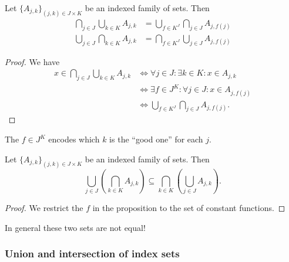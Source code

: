 \begin{proposition}
Let $\{A_{j,k}\}_{(j,k) \in J\times K}$ be an indexed family of sets. Then
\begin{align*}
\bigcap_{j\in J}\bigcup_{k\in K}A_{j,k} &= \bigcup_{f \in K^J}\bigcap_{j\in J}A_{j,f(j)} \\
\bigcup_{j\in J}\bigcap_{k\in K}A_{j,k} &= \bigcap_{f \in K^J}\bigcup_{j\in J}A_{j,f(j)}
\end{align*}
\end{proposition}
\begin{proof}
We have
\begin{align*}
x\in \bigcap_{j\in J}\bigcup_{k\in K}A_{j,k} &\iff \forall j\in J:\exists k\in K: x\in A_{j,k} \\
&\iff \exists f\in J^K: \forall j\in J: x\in A_{j, f(j)} \\
&\iff \bigcup_{f \in K^J}\bigcap_{j\in J}A_{j,f(j)}.
\end{align*}
\end{proof}
The $f\in J^K$ encodes which $k$ is the ``good one'' for each $j$.
\begin{corollary}
Let $\{A_{j,k}\}_{(j,k) \in J\times K}$ be an indexed family of sets. Then
\[ \bigcup_{j\in J}\left(\bigcap_{k\in K}A_{j,k}\right) \subseteq \bigcap_{k\in K}\left(\bigcup_{j\in J}A_{j,k}\right). \]
\end{corollary}
\begin{proof}
We restrict the $f$ in the proposition to the set of constant functions.
\end{proof}
In general these two sets are not equal!

\subsubsection{Union and intersection of index sets}

